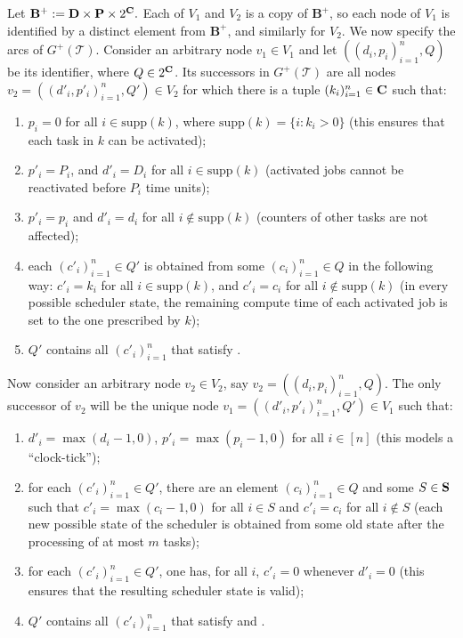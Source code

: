 \documentclass{llncs}
\newcommand{\tsys}{\ensuremath{\mathcal{T}}}
\newcommand{\backplus}{\ensuremath{\mathbf{B^+}}}
\newcommand{\supp}{\ensuremath{\mathrm{supp}}}
\begin{document}
Let $\backplus := \ttd \times \tta \times 2^{\rct}.$ Each of $V_1$ and $V_2$ is a copy of $\backplus$, so each node of $V_1$ is identified by a distinct element from $\backplus$, and similarly for $V_2$. 
We now specify the arcs of $G^+(\tsys)$. Consider an arbitrary node $v_1 \in V_1$ and let $((d_i,p_i)_{i=1}^n,Q)$ be its identifier, where $Q \in 2^{\mathbf{C}}$. Its successors in $G^+(\tsys)$ are all nodes $v_2=((d'_i,p'_i)_{i=1}^n,Q') \in V_2$ for which there is a tuple $(k_i)_{i=1}^n \in \mathbf{C}$ such that: 
\begin{enumerate}
\item $p_i = 0$ for all $i \in \supp(k)$, where $\supp(k)=\{i : k_i > 0\}$ (this ensures that each task in $k$ can be activated); 
\item $p'_i = P_i$, and $d'_i = D_i$ for all $i \in \supp(k)$ (activated jobs cannot be reactivated before $P_i$ time units); 
\item $p'_i = p_i$ and $d'_i = d_i$ for all $i \notin \supp(k)$ (counters of other tasks are not affected); 
\item \label{cond:complete1} each $(c'_i)_{i=1}^n \in Q'$ is obtained from some $(c_i)_{i=1}^n \in Q$ in the following way: $c'_i = k_i$ for all $i \in \supp(k)$, and $c'_i = c_i$ for all $i \notin \supp(k)$ (in every possible scheduler state, the remaining compute time of each activated job is set to the one prescribed by $k$);    
\item $Q'$ contains all $(c'_i)_{i=1}^n$ that satisfy .    
\end{enumerate}
Now consider an arbitrary node $v_2 \in V_2$, say $v_2 = ((d_i,p_i)_{i=1}^n, Q)$. The only successor of $v_2$ will be the unique node $v_1=((d'_i,p'_i)_{i=1}^n, Q') \in V_1$ such that: 
\begin{enumerate}
\item $d'_i = \max(d_i-1,0)$, $p'_i = \max(p_i-1,0)$ for all $i \in [n]$ (this models a ``clock-tick''); 
\item \label{cond:complete2} for each $(c'_i)_{i=1}^n \in Q'$, there are an element $(c_i)_{i=1}^n \in Q$ and some $S \in \mathbf{S}$ such that $c'_i = \max(c_i-1,0)$ for all $i \in S$ and $c'_i = c_i$ for all $i \notin S$ (each new possible state of the scheduler is obtained from some old state after the processing of at most $m$ tasks); 
\item \label{cond:complete3}
 for each $(c'_i)_{i=1}^n \in Q'$, one has, for all $i$, $c'_i = 0$ whenever $d'_i=0$ (this ensures that the resulting scheduler state is valid); 
\item $Q'$ contains all $(c'_i)_{i=1}^n$ that satisfy  and . 
\end{enumerate}
\end{document}
